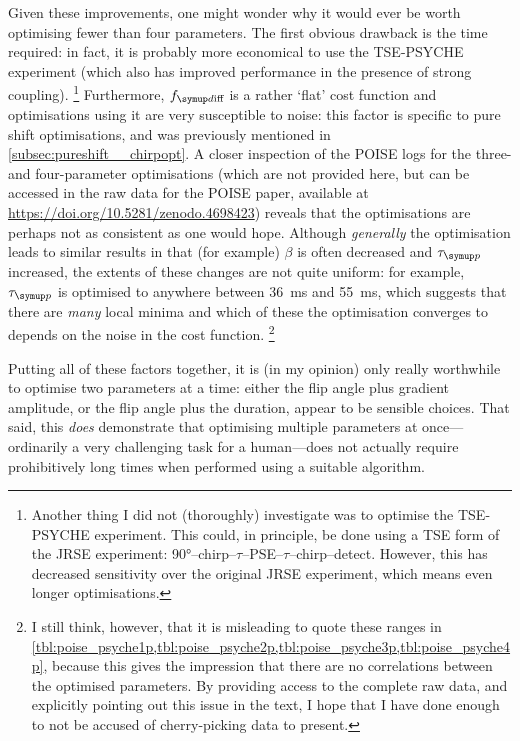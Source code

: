 Given these improvements, one might wonder why it would ever be worth optimising fewer than four parameters.
The first obvious drawback is the time required: in fact, it is probably more economical to use the TSE-PSYCHE experiment (which also has improved performance in the presence of strong coupling).%
\footnote{Another thing I did not (thoroughly) investigate was to optimise the TSE-PSYCHE experiment. This could, in principle, be done using a TSE form of the JRSE experiment: \ang{90}--chirp--$\tau$--PSE--$\tau$--chirp--detect. However, this has decreased sensitivity over the original JRSE experiment, which means even longer optimisations.}
Furthermore, $\fdiff$ is a rather `flat' cost function and optimisations using it are very susceptible to noise: this factor is specific to pure shift optimisations, and was previously mentioned in \cref{subsec:pureshift__chirpopt}.
A closer inspection of the POISE logs for the three- and four-parameter optimisations (which are not provided here, but can be accessed in the raw data for the POISE paper, available at \url{https://doi.org/10.5281/zenodo.4698423}) reveals that the optimisations are perhaps not as consistent as one would hope.
Although \textit{generally} the optimisation leads to similar results in that (for example) $\beta$ is often decreased and $\taup$ increased, the extents of these changes are not quite uniform: for example, $\taup$ is optimised to anywhere between \qty{36}{\ms} and \qty{55}{\ms}, which suggests that there are \textit{many} local minima and which of these the optimisation converges to depends on the noise in the cost function.%
\footnote{I still think, however, that it is misleading to quote these ranges in \cref{tbl:poise_psyche1p,tbl:poise_psyche2p,tbl:poise_psyche3p,tbl:poise_psyche4p}, because this gives the impression that there are no correlations between the optimised parameters. By providing access to the complete raw data, and explicitly pointing out this issue in the text, I hope that I have done enough to not be accused of cherry-picking data to present.}

Putting all of these factors together, it is (in my opinion) only really worthwhile to optimise two parameters at a time: either the flip angle plus gradient amplitude, or the flip angle plus the duration, appear to be sensible choices.
That said, this \textit{does} demonstrate that optimising multiple parameters at once---ordinarily a very challenging task for a human---does not actually require prohibitively long times when performed using a suitable algorithm.
